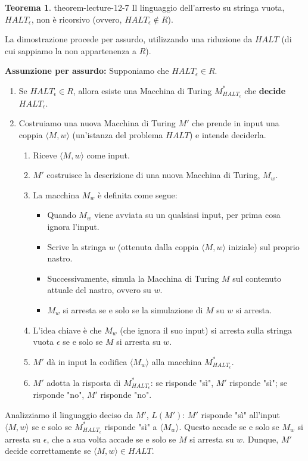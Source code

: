 \documentclass[a4paper]{article}
\makeatletter
\theoremstyle{definition} %
\newtheorem{theorem}{Teorema}
[section] %
\renewenvironment{proof}[1][\proofname]{\par
  \pushQED{\qed}%
  \normalfont \topsep6\p@\@plus6\p@\relax
  \trivlist
  \item[\hskip\labelsep
        \bfseries
    #1\@addpunct{.}]\ignorespaces
}{%
  \popQED\endtrivlist\@endpefalse
}
\makeatother
\begin{document}
\begin{theorem}{}{{ theorem-lecture-12-7 }}
Il linguaggio dell'arresto su stringa vuota, $HALT_\epsilon$, non è ricorsivo (ovvero, $HALT_\epsilon \notin R$).
\end{theorem}
\begin{proof}
La dimostrazione procede per assurdo, utilizzando una riduzione da $HALT$ (di cui sappiamo la non appartenenza a $R$).

\textbf{Assunzione per assurdo:} Supponiamo che $HALT_\epsilon \in R$.
\begin{enumerate}
    \item Se $HALT_\epsilon \in R$, allora esiste una Macchina di Turing $M_{HALT_\epsilon}^*$ che \textbf{decide} $HALT_\epsilon$.
    \item Costruiamo una nuova Macchina di Turing $M'$ che prende in input una coppia $\langle M, w \rangle$ (un'istanza del problema $HALT$) e intende deciderla.
    \begin{enumerate}
        \item Riceve $\langle M, w \rangle$ come input.
        \item $M'$ costruisce la descrizione di una nuova Macchina di Turing, $M_{w}$.
        \item La macchina $M_w$ è definita come segue:
        \begin{itemize}
            \item Quando $M_w$ viene avviata su un qualsiasi input, per prima cosa ignora l'input.
            \item Scrive la stringa $w$ (ottenuta dalla coppia $\langle M, w \rangle$ iniziale) sul proprio nastro.
            \item Successivamente, simula la Macchina di Turing $M$ sul contenuto attuale del nastro, ovvero su $w$.
            \item $M_w$ si arresta se e solo se la simulazione di $M$ su $w$ si arresta.
        \end{itemize}
        \item L'idea chiave è che $M_w$ (che ignora il suo input) si arresta sulla stringa vuota $\epsilon$ se e solo se $M$ si arresta su $w$.
        \item $M'$ dà in input la codifica $\langle M_w \rangle$ alla macchina $M_{HALT_\epsilon}^*$.
        \item $M'$ adotta la risposta di $M_{HALT_\epsilon}^*$: se risponde "sì", $M'$ risponde "sì"; se risponde "no", $M'$ risponde "no".
    \end{enumerate}
\end{enumerate}
Analizziamo il linguaggio deciso da $M'$, $L(M')$:
$M'$ risponde "sì" all'input $\langle M, w \rangle$ se e solo se $M_{HALT_\epsilon}^*$ risponde "sì" a $\langle M_w \rangle$. Questo accade se e solo se $M_w$ si arresta su $\epsilon$, che a sua volta accade se e solo se $M$ si arresta su $w$.
Dunque, $M'$ decide correttamente se $\langle M, w \rangle \in HALT$.


\end{proof}
\end{document}

